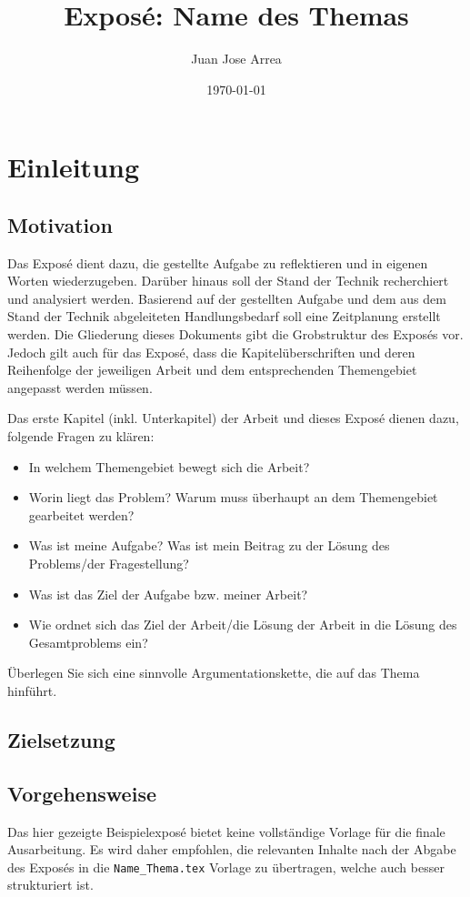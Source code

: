 \documentclass[ a4paper,
                toc=bibliography
              ]{scrartcl}
\author{Juan Jose Arrea}
\title{Exposé: Name des Themas}
\date{\today}
\begin{document}
\maketitle
	
\section{Einleitung}
\subsection{Motivation}

Das Exposé dient dazu, die gestellte Aufgabe zu reflektieren und in eigenen Worten wiederzugeben. 
Darüber hinaus soll der Stand der Technik recherchiert und analysiert werden. Basierend auf der gestellten Aufgabe und dem aus dem Stand der Technik abgeleiteten Handlungsbedarf soll eine Zeitplanung erstellt werden. 
Die Gliederung dieses Dokuments gibt die Grobstruktur des Exposés vor. Jedoch gilt auch für das Exposé, dass die Kapitelüberschriften und deren Reihenfolge der jeweiligen Arbeit und dem entsprechenden Themengebiet angepasst werden müssen.

Das erste Kapitel (inkl. Unterkapitel) der Arbeit und dieses Exposé dienen dazu, folgende Fragen zu klären:

\begin{itemize}
    \item In welchem Themengebiet bewegt sich die Arbeit?
    \item Worin liegt das Problem? Warum muss überhaupt an dem Themengebiet gearbeitet werden?
    \item Was ist meine Aufgabe? Was ist mein Beitrag zu der Lösung des Problems/der Fragestellung?
    \item Was ist das Ziel der Aufgabe bzw. meiner Arbeit?
    \item Wie ordnet sich das Ziel der Arbeit/die Lösung der Arbeit in die Lösung des Gesamtproblems ein?
\end{itemize}

Überlegen Sie sich eine sinnvolle Argumentationskette, die auf das Thema hinführt.


\subsection{Zielsetzung}

\subsection{Vorgehensweise}
Das hier gezeigte Beispielexposé bietet keine vollständige Vorlage für die finale Ausarbeitung. Es wird daher empfohlen, die relevanten Inhalte nach der Abgabe des Exposés in die \texttt{Name\_Thema.tex} Vorlage zu übertragen, welche auch besser strukturiert ist.
\end{document}
